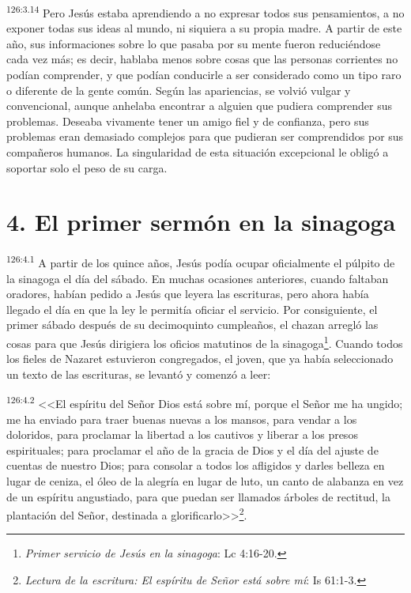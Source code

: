 \par 
\textsuperscript{126:3.14} Pero Jesús estaba aprendiendo a no expresar todos sus pensamientos, a no exponer todas sus ideas al mundo, ni siquiera a su propia madre. A partir de este año, sus informaciones sobre lo que pasaba por su mente fueron reduciéndose cada vez más; es decir, hablaba menos sobre cosas que las personas corrientes no podían comprender, y que podían conducirle a ser considerado como un tipo raro o diferente de la gente común. Según las apariencias, se volvió vulgar y convencional, aunque anhelaba encontrar a alguien que pudiera comprender sus problemas. Deseaba vivamente tener un amigo fiel y de confianza, pero sus problemas eran demasiado complejos para que pudieran ser comprendidos por sus compañeros humanos. La singularidad de esta situación excepcional le obligó a soportar solo el peso de su carga.

\section*{4. El primer sermón en la sinagoga}
\par 
\textsuperscript{126:4.1} A partir de los quince años, Jesús podía ocupar oficialmente el púlpito de la sinagoga el día del sábado. En muchas ocasiones anteriores, cuando faltaban oradores, habían pedido a Jesús que leyera las escrituras, pero ahora había llegado el día en que la ley le permitía oficiar el servicio. Por consiguiente, el primer sábado después de su decimoquinto cumpleaños, el chazan arregló las cosas para que Jesús dirigiera los oficios matutinos de la sinagoga\footnote{\textit{Primer servicio de Jesús en la sinagoga}: Lc 4:16-20.}. Cuando todos los fieles de Nazaret estuvieron congregados, el joven, que ya había seleccionado un texto de las escrituras, se levantó y comenzó a leer:

\par 
\textsuperscript{126:4.2} <<El espíritu del Señor Dios está sobre mí, porque el Señor me ha ungido; me ha enviado para traer buenas nuevas a los mansos, para vendar a los doloridos, para proclamar la libertad a los cautivos y liberar a los presos espirituales; para proclamar el año de la gracia de Dios y el día del ajuste de cuentas de nuestro Dios; para consolar a todos los afligidos y darles belleza en lugar de ceniza, el óleo de la alegría en lugar de luto, un canto de alabanza en vez de un espíritu angustiado, para que puedan ser llamados árboles de rectitud, la plantación del Señor, destinada a glorificarlo>>\footnote{\textit{Lectura de la escritura: El espíritu de Señor está sobre mí}: Is 61:1-3.}.

